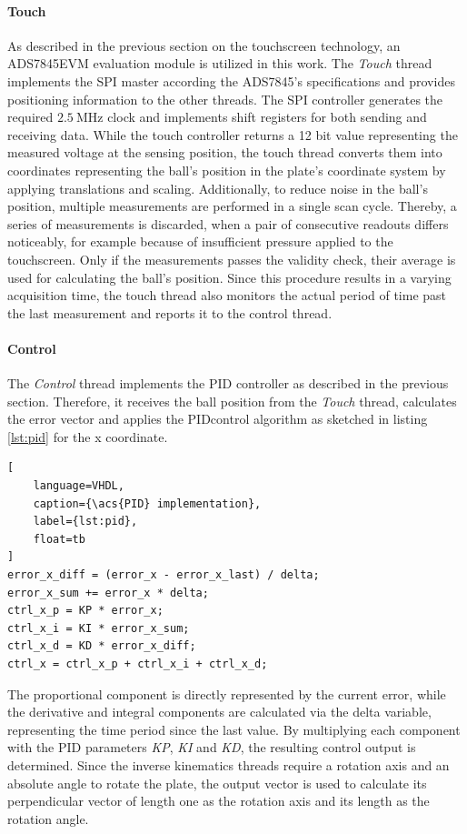 \paragraph{Touch} As described in the previous section on the touchscreen
technology, an ADS7845EVM evaluation module is utilized in this work. The
\emph{Touch} thread implements the \ac{SPI} master according the ADS7845's
specifications and provides positioning information to the other threads. The
\ac{SPI} controller generates the required $\SI{2.5}{\mega\hertz}$ clock and
implements shift registers for both sending and receiving data. While the
touch controller returns a 12 bit value representing the measured voltage at
the sensing position, the touch thread converts them into coordinates
representing the ball's position in the plate's coordinate system by applying
translations and scaling. Additionally, to reduce noise in the ball's
position, multiple measurements are performed in a single scan cycle. Thereby,
a series of measurements is discarded, when a pair of consecutive readouts
differs noticeably, for example because of insufficient pressure applied to
the touchscreen. Only if the measurements passes the validity check, their
average is used for calculating the ball's position. Since this procedure
results in a varying acquisition time, the touch thread also monitors the
actual period of time past the last measurement and reports it to the control
thread.

\paragraph{Control} The \emph{Control} thread implements the \ac{PID}
controller as described in the previous section. Therefore, it receives the
ball position from the \emph{Touch} thread, calculates the error vector and
applies the \ac{PID}control algorithm as sketched in listing \ref{lst:pid} for
the x coordinate.
\begin{lstlisting}[
	language=VHDL,
	caption={\acs{PID} implementation},
	label={lst:pid},
	float=tb
]
error_x_diff = (error_x - error_x_last) / delta;
error_x_sum += error_x * delta;
ctrl_x_p = KP * error_x;
ctrl_x_i = KI * error_x_sum;
ctrl_x_d = KD * error_x_diff;
ctrl_x = ctrl_x_p + ctrl_x_i + ctrl_x_d;
\end{lstlisting}
The proportional component is directly represented by the current error, while
the derivative and integral components are calculated via the delta variable,
representing the time period since the last value. By multiplying each
component with the \ac{PID} parameters \emph{KP}, \emph{KI} and \emph{KD}, the
resulting control output is determined. Since the inverse kinematics threads
require a rotation axis and an absolute angle to rotate the plate, the output
vector is used to calculate its perpendicular vector of length one as the
rotation axis and its length as the rotation angle.

